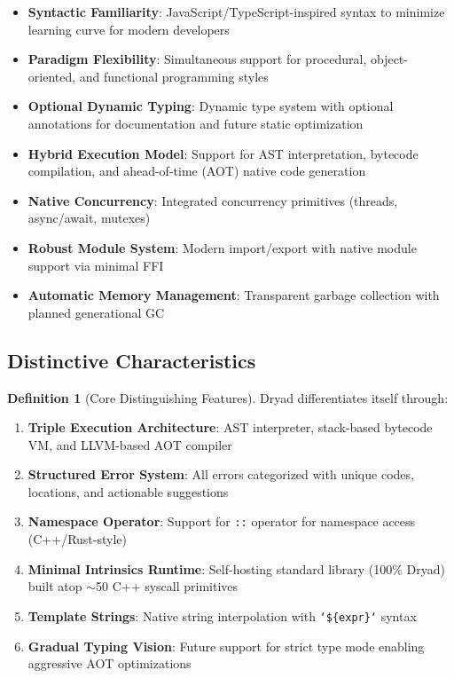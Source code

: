 \documentclass[12pt,a4paper]{article}
\theoremstyle{definition}
\newtheorem{definition}{Definition}[section]
\begin{document}
\begin{itemize}[leftmargin=*, itemsep=5pt]
    \item \textbf{Syntactic Familiarity}: JavaScript/TypeScript-inspired syntax to minimize learning curve for modern developers
    \item \textbf{Paradigm Flexibility}: Simultaneous support for procedural, object-oriented, and functional programming styles
    \item \textbf{Optional Dynamic Typing}: Dynamic type system with optional annotations for documentation and future static optimization
    \item \textbf{Hybrid Execution Model}: Support for AST interpretation, bytecode compilation, and ahead-of-time (AOT) native code generation
    \item \textbf{Native Concurrency}: Integrated concurrency primitives (threads, async/await, mutexes)
    \item \textbf{Robust Module System}: Modern import/export with native module support via minimal FFI
    \item \textbf{Automatic Memory Management}: Transparent garbage collection with planned generational GC
\end{itemize}

\subsection{Distinctive Characteristics}

\begin{definition}[Core Distinguishing Features]
Dryad differentiates itself through:
\begin{enumerate}[leftmargin=*, itemsep=3pt]
    \item \textbf{Triple Execution Architecture}: AST interpreter, stack-based bytecode VM, and LLVM-based AOT compiler
    \item \textbf{Structured Error System}: All errors categorized with unique codes, locations, and actionable suggestions
    \item \textbf{Namespace Operator}: Support for \texttt{::} operator for namespace access (C++/Rust-style)
    \item \textbf{Minimal Intrinsics Runtime}: Self-hosting standard library (100\% Dryad) built atop $\sim$50 C++ syscall primitives
    \item \textbf{Template Strings}: Native string interpolation with \texttt{`\$\{expr\}`} syntax
    \item \textbf{Gradual Typing Vision}: Future support for strict type mode enabling aggressive AOT optimizations
\end{enumerate}
\end{definition}
\end{document}
